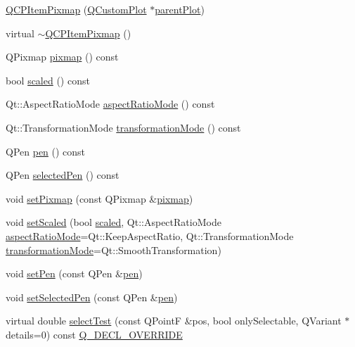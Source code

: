 \begin{DoxyCompactItemize}
\item 
\hyperlink{class_q_c_p_item_pixmap_aa6de42a37261b21a5480e7da122345c3}{Q\+C\+P\+Item\+Pixmap} (\hyperlink{class_q_custom_plot}{Q\+Custom\+Plot} $\ast$\hyperlink{class_q_c_p_layerable_a473edb813a4c1929d6b6a8fe3ff3faf7}{parent\+Plot})
\item 
virtual \hyperlink{class_q_c_p_item_pixmap_a810cac6a409d963cda6ea2d3152f1fd0}{$\sim$\+Q\+C\+P\+Item\+Pixmap} ()
\item 
Q\+Pixmap \hyperlink{class_q_c_p_item_pixmap_a7daef7e0c432902d69e7db3e0e217a1f}{pixmap} () const
\item 
bool \hyperlink{class_q_c_p_item_pixmap_a8768534b5f3080abfc007db198373327}{scaled} () const
\item 
Qt\+::\+Aspect\+Ratio\+Mode \hyperlink{class_q_c_p_item_pixmap_a662cbca12e6cdcd2a94b0b08879292fd}{aspect\+Ratio\+Mode} () const
\item 
Qt\+::\+Transformation\+Mode \hyperlink{class_q_c_p_item_pixmap_ab963aa9693d49c323948f2820a5785b6}{transformation\+Mode} () const
\item 
Q\+Pen \hyperlink{class_q_c_p_item_pixmap_a6ae9922eba6386a5ac4e2a569ec29e1f}{pen} () const
\item 
Q\+Pen \hyperlink{class_q_c_p_item_pixmap_a23806a20efcb172f0309e18809dc49d8}{selected\+Pen} () const
\item 
void \hyperlink{class_q_c_p_item_pixmap_a726b69ea4025edf48f9b29b6450548a7}{set\+Pixmap} (const Q\+Pixmap \&\hyperlink{class_q_c_p_item_pixmap_a7daef7e0c432902d69e7db3e0e217a1f}{pixmap})
\item 
void \hyperlink{class_q_c_p_item_pixmap_ab4d44529a1c6c8d37d0ea7560e042777}{set\+Scaled} (bool \hyperlink{class_q_c_p_item_pixmap_a8768534b5f3080abfc007db198373327}{scaled}, Qt\+::\+Aspect\+Ratio\+Mode \hyperlink{class_q_c_p_item_pixmap_a662cbca12e6cdcd2a94b0b08879292fd}{aspect\+Ratio\+Mode}=Qt\+::\+Keep\+Aspect\+Ratio, Qt\+::\+Transformation\+Mode \hyperlink{class_q_c_p_item_pixmap_ab963aa9693d49c323948f2820a5785b6}{transformation\+Mode}=Qt\+::\+Smooth\+Transformation)
\item 
void \hyperlink{class_q_c_p_item_pixmap_acdade1305edb4b5cae14f97fd132065f}{set\+Pen} (const Q\+Pen \&\hyperlink{class_q_c_p_item_pixmap_a6ae9922eba6386a5ac4e2a569ec29e1f}{pen})
\item 
void \hyperlink{class_q_c_p_item_pixmap_afc5e479e88e53740176ce77cb70dd67a}{set\+Selected\+Pen} (const Q\+Pen \&\hyperlink{class_q_c_p_item_pixmap_a6ae9922eba6386a5ac4e2a569ec29e1f}{pen})
\item 
virtual double \hyperlink{class_q_c_p_item_pixmap_a65d1ede7bb479b90d40186d083071947}{select\+Test} (const Q\+PointF \&pos, bool only\+Selectable, Q\+Variant $\ast$details=0) const \hyperlink{qcustomplot_8h_a42cc5eaeb25b85f8b52d2a4b94c56f55}{Q\+\_\+\+D\+E\+C\+L\+\_\+\+O\+V\+E\+R\+R\+I\+DE}
\end{DoxyCompactItemize}
